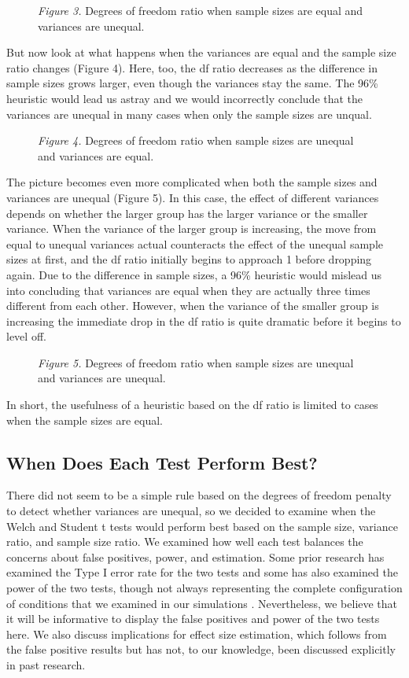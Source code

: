 \documentclass[man,a4paper,noextraspace,apacite]{apa6}
\begin{document}
\begin{figure}
\textit{Figure 3.} Degrees of freedom ratio when sample sizes are equal and variances are unequal.
\end{figure}

    But now look at what happens when the variances are equal and the sample size ratio changes (Figure 4). Here, too, the df ratio decreases as the difference in sample sizes grows larger, even though the variances stay the same. The 96\% heuristic would lead us astray and we would incorrectly conclude that the variances are unequal in many cases when only the sample sizes are unqual.

\begin{figure}
\textit{Figure 4.} Degrees of freedom ratio when sample sizes are unequal and variances are equal.
\end{figure}

    The picture becomes even more complicated when both the sample sizes and variances are unequal (Figure 5). In this case, the effect of different variances depends on whether the larger group has the larger variance or the smaller variance. When the variance of the larger group is increasing, the move from equal to unequal variances actual counteracts the effect of the unequal sample sizes at first, and the df ratio initially begins to approach 1 before dropping again. Due to the difference in sample sizes, a 96\% heuristic would mislead us into concluding that variances are equal when they are actually three times different from each other. However, when the variance of the smaller group is increasing the immediate drop in the df ratio is quite dramatic before it begins to level off. 

\begin{figure}
\textit{Figure 5.} Degrees of freedom ratio when sample sizes are unequal and variances are unequal.
\end{figure}
    In short, the usefulness of a heuristic based on the df ratio is limited to cases when the sample sizes are equal. 

\subsection{When Does Each Test Perform Best?}
    There did not seem to be a simple rule based on the degrees of freedom penalty to detect whether variances are unequal, so we decided to examine when the Welch and Student t tests would perform best based on the sample size, variance ratio, and sample size ratio. We examined how well each test balances the concerns about false positives, power, and estimation. Some prior research has examined the Type I error rate for the two tests \cite{Boneau1960, Zimmerman1993, Zimmerman2004, Zimmerman1996, Zimmerman2009} and some has also examined the power of the two tests, though not always representing the complete configuration of conditions that we examined in our simulations \cite{Neuhauser2002, Zimmerman1993}. Nevertheless, we believe that it will be informative to display the false positives and power of the two tests here. We also discuss implications for effect size estimation, which follows from the false positive results but has not, to our knowledge, been discussed explicitly in past research.
\end{document}
